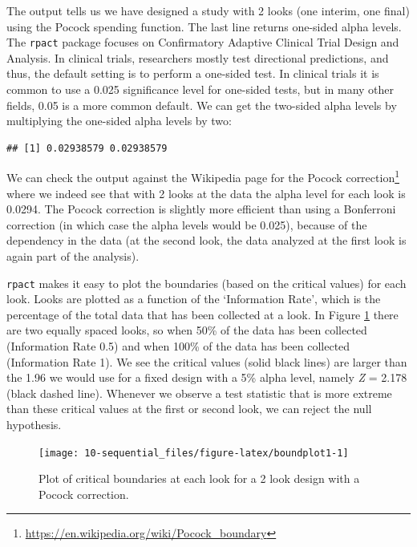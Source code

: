 \documentclass[
  oneside]{krantz}
\makeatletter
\newenvironment{Shaded}{\begin{snugshade}}{\end{snugshade}}
\newcommand{\DecValTok}[1]{\textcolor[rgb]{0.06,0.06,0.06}{#1}}
\newcommand{\NormalTok}[1]{#1}
\newcommand{\SpecialCharTok}[1]{\textcolor[rgb]{0,0,0}{#1}}
\renewcommand{\href}[2]{#2\footnote{\url{#1}}}
\newenvironment{kframe}{%
\medskip{}
\setlength{\fboxsep}{.8em}
 \def\at@end@of@kframe{}%
 \ifinner\ifhmode%
  \def\at@end@of@kframe{\end{minipage}}%
  \begin{minipage}{\columnwidth}%
 \fi\fi%
 \def\FrameCommand##1{\hskip\@totalleftmargin \hskip-\fboxsep
 \colorbox{shadecolor}{##1}\hskip-\fboxsep
     \hskip-\linewidth \hskip-\@totalleftmargin \hskip\columnwidth}%
 \MakeFramed {\advance\hsize-\width
   \@totalleftmargin\z@ \linewidth\hsize
   \@setminipage}}%
 {\par\unskip\endMakeFramed%
 \at@end@of@kframe}
\renewenvironment{Shaded}{\begin{kframe}}{\end{kframe}}
\makeatother
\begin{document}
The output tells us we have designed a study with 2 looks (one interim, one final) using the Pocock spending function. The last line returns one-sided alpha levels. The \texttt{rpact} package focuses on Confirmatory Adaptive Clinical Trial Design and Analysis. In clinical trials, researchers mostly test directional predictions, and thus, the default setting is to perform a one-sided test. In clinical trials it is common to use a 0.025 significance level for one-sided tests, but in many other fields, 0.05 is a more common default. We can get the two-sided alpha levels by multiplying the one-sided alpha levels by two:

\begin{Shaded}
\end{Shaded}

\begin{verbatim}
## [1] 0.02938579 0.02938579
\end{verbatim}

We can check the output against the \href{https://en.wikipedia.org/wiki/Pocock_boundary}{Wikipedia page for the Pocock correction} where we indeed see that with 2 looks at the data the alpha level for each look is 0.0294. The Pocock correction is slightly more efficient than using a Bonferroni correction (in which case the alpha levels would be 0.025), because of the dependency in the data (at the second look, the data analyzed at the first look is again part of the analysis).

\texttt{rpact} makes it easy to plot the boundaries (based on the critical values) for each look. Looks are plotted as a function of the `Information Rate', which is the percentage of the total data that has been collected at a look. In Figure \ref{fig:boundplot1} there are two equally spaced looks, so when 50\% of the data has been collected (Information Rate 0.5) and when 100\% of the data has been collected (Information Rate 1). We see the critical values (solid black lines) are larger than the 1.96 we would use for a fixed design with a 5\% alpha level, namely \emph{Z} = 2.178 (black dashed line). Whenever we observe a test statistic that is more extreme than these critical values at the first or second look, we can reject the null hypothesis.



\begin{figure}

{\centering \texttt{[image: 10-sequential\_files/figure-latex/boundplot1-1]} 

}

\caption{Plot of critical boundaries at each look for a 2 look design with a Pocock correction.}\label{fig:boundplot1}
\end{figure}
\end{document}
